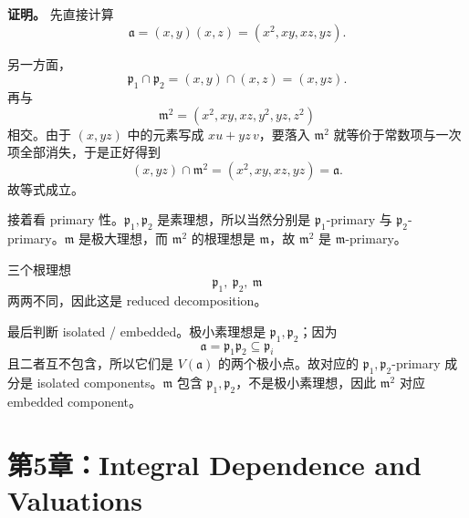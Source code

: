 \documentclass[a4paper]{ctexart}
\begin{document}
\begin{enumerate}[leftmargin=*, label=\textbf{4.\arabic*.}]
\textbf{证明。}
先直接计算
\[
\mathfrak a=(x,y)(x,z)=(x^2,xy,xz,yz).
\]

另一方面，
\[
\mathfrak p_1\cap\mathfrak p_2=(x,y)\cap(x,z)=(x,yz).
\]
再与
\[
\mathfrak m^2=(x^2,xy,xz,y^2,yz,z^2)
\]
相交。由于 \((x,yz)\) 中的元素写成 \(xu+yz\,v\)，要落入 \(\mathfrak m^2\) 就等价于常数项与一次项全部消失，于是正好得到
\[
(x,yz)\cap \mathfrak m^2=(x^2,xy,xz,yz)=\mathfrak a.
\]
故等式成立。

接着看 primary 性。\(\mathfrak p_1,\mathfrak p_2\) 是素理想，所以当然分别是 \(\mathfrak p_1\)-primary 与 \(\mathfrak p_2\)-primary。\(\mathfrak m\) 是极大理想，而 \(\mathfrak m^2\) 的根理想是 \(\mathfrak m\)，故 \(\mathfrak m^2\) 是 \(\mathfrak m\)-primary。

三个根理想
\[
\mathfrak p_1,\ \mathfrak p_2,\ \mathfrak m
\]
两两不同，因此这是 reduced decomposition。

最后判断 isolated / embedded。极小素理想是 \(\mathfrak p_1,\mathfrak p_2\)；因为
\[
\mathfrak a=\mathfrak p_1\mathfrak p_2\subseteq \mathfrak p_i
\]
且二者互不包含，所以它们是 \(V(\mathfrak a)\) 的两个极小点。故对应的 \(\mathfrak p_1,\mathfrak p_2\)-primary 成分是 isolated components。\(\mathfrak m\) 包含 \(\mathfrak p_1,\mathfrak p_2\)，不是极小素理想，因此 \(\mathfrak m^2\) 对应 embedded component。
\end{enumerate}

\section{第5章：Integral Dependence and Valuations}
\end{document}
